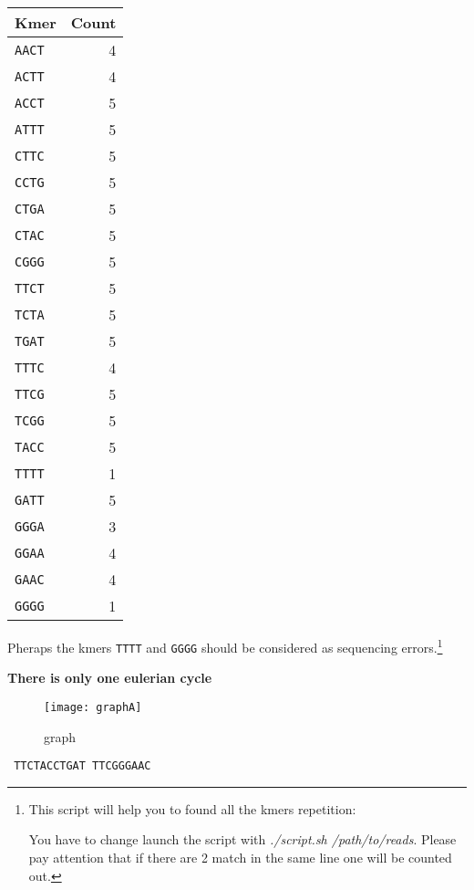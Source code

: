 \begin{Answer} [
  ref={exA},
  number={6}
 ]

  \Question

\begin{tabular}{ | l | r | }
  \hline
  \textbf{Kmer} & \textbf{Count} \\ \hline
  \texttt{AACT} & 4 \\ \hline
  \texttt{ACTT} & 4 \\ \hline
  \texttt{ACCT} & 5 \\ \hline
  \texttt{ATTT} & 5 \\ \hline
  \texttt{CTTC} & 5 \\ \hline
  \texttt{CCTG} & 5 \\ \hline
  \texttt{CTGA} & 5 \\ \hline
  \texttt{CTAC} & 5 \\ \hline
  \texttt{CGGG} & 5 \\ \hline
  \texttt{TTCT} & 5 \\ \hline
  \texttt{TCTA} & 5 \\ \hline
  \texttt{TGAT} & 5 \\ \hline
  \texttt{TTTC} & 4 \\ \hline
  \texttt{TTCG} & 5 \\ \hline
  \texttt{TCGG} & 5 \\ \hline
  \texttt{TACC} & 5 \\ \hline
  \texttt{TTTT} & 1 \\ \hline
  \texttt{GATT} & 5 \\ \hline
  \texttt{GGGA} & 3 \\ \hline
  \texttt{GGAA} & 4 \\ \hline
  \texttt{GAAC} & 4 \\ \hline
  \texttt{GGGG} & 1 \\ \hline
\end{tabular}

Pheraps the kmers \texttt{TTTT} and \texttt{GGGG} should be considered as
sequencing errors.\footnote{
This script will help you to found all the kmers repetition:

You have to change launch the script with \textit{./script.sh /path/to/reads}.
Please pay attention that if there are 2 match in the same line one will be
counted out.}


  \Question \textbf{There is only one eulerian cycle}
\begin{figure}[H]
  \centering
  \texttt{[image: graphA]}
  \caption{graph}
\end{figure}

  \Question \texttt{{\color{red} TTC}TACCTGAT{\color{red} TTC}GGGAAC}
\end{Answer}

